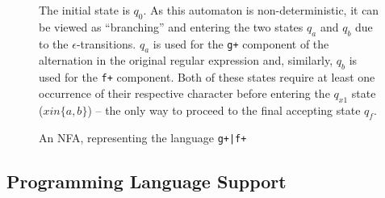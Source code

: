 \documentclass[a4paper,openany,12pt]{book}
\begin{document}
\begin{figure}
    \begin{MyMdframed}
    \vspace{0.5em}
 

\caption{\label{figure:nfa:1} An NFA, representing the language \texttt{g+|f+}}
\vspace{0.5em}
\captionsetup{style=default}

        
\vspace{0.5em}

The initial state is $q_0$. As this automaton is non-deterministic, it can be viewed as ``branching'' and entering the
two states $q_a$ and $q_b$ due to the $\epsilon$-transitions.
$q_a$ is used for the \texttt{g+} component of the alternation in the original regular expression and, similarly, $q_b$
is used for the \texttt{f+} component.
Both of these states require at least one occurrence of their respective character before entering the $q_{x1}$ state
($x in \{a, b\}$) -- the only way to proceed to the final accepting state $q_f$.

\vspace{0.5em}

\end{MyMdframed}
\end{figure}

\subsection{Programming Language Support}
\end{document}

